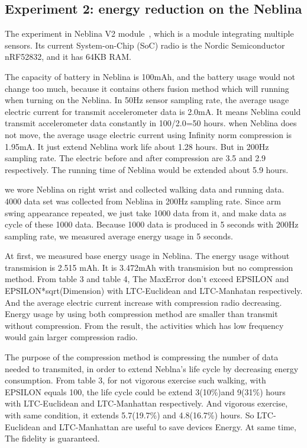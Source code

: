 \documentclass[10pt, conference, compsocconf]{IEEEtran}
\begin{document}
\subsection{Experiment 2: energy reduction on the Neblina}
The experiment in Neblina V2 module~\cite{Neblina}, which is a module integrating multiple sensors. Its current System-on-Chip (SoC) radio is the Nordic Semiconductor nRF52832, and it has 64KB RAM.

The capacity of battery in Neblina is 100mAh, and the battery usage would not change too much, because it contains others fusion method which will running when turning on the Neblina.
In 50Hz sensor sampling rate, the average usage electric current for transmit accelerometer data is 2.0mA. It means Neblina could transmit accelerometer data constantly in 100/2.0=50 hours.
when Neblina does not move, the average usage electric current using Infinity norm compression is 1.95mA. It just extend Neblina work life about 1.28 hours.
But in 200Hz sampling rate. The electric before and after compression are 3.5 and 2.9 respectively. The running time of Neblina would be extended about 5.9 hours.

we wore Neblina on right wrist and
collected walking data and running data. 4000 data set was collected
from Neblina in 200Hz sampling rate. Since arm swing appearance
repeated, we just take 1000 data from it, and make data as cycle of
these 1000 data. Because 1000 data is produced in 5 seconds with 200Hz
sampling rate, we measured average energy usage in 5 seconds.


At first, we measured base energy usage in Neblina. The energy usage
without transmision is 2.515 mAh. It is 3.472mAh with transmision but
no compression method. From table 3 and table 4, The MaxError don't exceed EPSILON
and EPSILON*sqrt(Dimension) with LTC-Euclidean and LTC-Manhatan respectively.
And the average electric current increase with compression radio decreasing.
Energy usage by using both compression method are smaller than transmit
without compression. From the result, the activities which has low frequency
would gain larger compression radio.

The purpose of the compression method is compressing the number of
data needed to transmited, in order to extend Neblna's life cycle
by decreasing energy consumption. From table 3, for not vigorous exercise
such walking, with EPSILON equals 100, the life cycle could be extend
3(10\%)and 9(31\%) hours with LTC-Euclidean and LTC-Manhattan respectively.
And vigorous exercise, with same condition, it extends 5.7(19.7\%)
and 4.8(16.7\%) hours. So LTC-Euclidean and LTC-Manhattan are useful
to save devices Energy. At same time, The fidelity is guaranteed.
\end{document}
